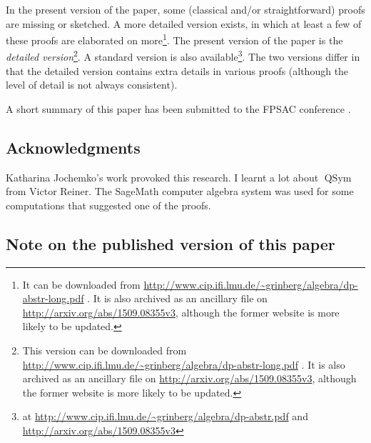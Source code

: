 \documentclass[numbers=enddot,12pt,final,onecolumn,notitlepage,abstracton]{scrartcl}
\theoremstyle{definition}
\newenvironment{verlong}{}{}
\newenvironment{vershort}{}{}
\newcommand{\QSym}{{\operatorname{QSym}}}
\begin{document}
\begin{vershort}
In the present version of the paper, some (classical and/or
straightforward) proofs are missing or sketched. A more detailed
version exists, in which at least a few of these proofs are
elaborated on more\footnote{It can be downloaded from \newline
\url{http://www.cip.ifi.lmu.de/~grinberg/algebra/dp-abstr-long.pdf} .
It is also archived as an ancillary file on
\url{http://arxiv.org/abs/1509.08355v3}, although the former
website is more likely to be updated.}.
\end{vershort}
\begin{verlong}
The present version of the paper is the
\textit{detailed version}\footnote{This version can be downloaded
from \newline
\url{http://www.cip.ifi.lmu.de/~grinberg/algebra/dp-abstr-long.pdf} .
It is also archived as an ancillary file on
\url{http://arxiv.org/abs/1509.08355v3}, although the former
website is more likely to be updated.}.
A standard version is also available\footnote{at
\url{http://www.cip.ifi.lmu.de/~grinberg/algebra/dp-abstr.pdf}
and
\url{http://arxiv.org/abs/1509.08355v3}}.
The two versions differ in that the detailed version contains extra
details in various proofs (although the level of detail is not
always consistent).
\end{verlong}

A short summary of this paper has been submitted to the FPSAC
conference \cite{Gri-extabs}.

\subsection*{Acknowledgments}

Katharina Jochemko's work \cite{Joch} provoked this research.
I learnt a lot about $\QSym$ from Victor Reiner. The SageMath
computer algebra system \cite{SageMath} was used for some
computations that suggested one of the proofs.

\subsection*{Note on the published version of this paper}
\end{document}
